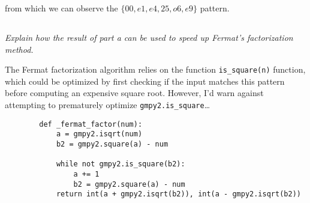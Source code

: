 \documentclass[12pt]{article}
\begin{document}
    from which we can observe the $\{00, e1, e4, 25, o6, e9\}$ pattern.

    \subsection{} \textit{Explain how the result of part \textup{a} can be used to speed up Fermat's factorization method.}

    The Fermat factorization algorithm relies on the function \texttt{is_square(n)} function, which could be optimized by first checking if the input matches this pattern before computing an expensive square root. However, I'd warn against attempting to prematurely optimize \texttt{gmpy2.is_square}\ldots

    \begin{verbatim}
        def _fermat_factor(num):
            a = gmpy2.isqrt(num)
            b2 = gmpy2.square(a) - num

            while not gmpy2.is_square(b2):
                a += 1
                b2 = gmpy2.square(a) - num
            return int(a + gmpy2.isqrt(b2)), int(a - gmpy2.isqrt(b2))
    \end{verbatim}
\end{document}
